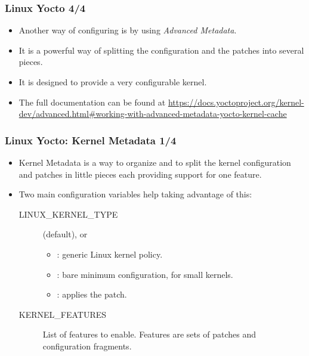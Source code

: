 \begin{frame}
  \frametitle{Linux Yocto 4/4}
  \begin{itemize}
    \item Another way of configuring  is by using
      \emph{Advanced Metadata}.
    \item It is a powerful way of splitting the configuration and the
      patches into several pieces.
    \item It is designed to provide a very configurable kernel.
    \item The full documentation can be found at
      \url{https://docs.yoctoproject.org/kernel-dev/advanced.html\#working-with-advanced-metadata-yocto-kernel-cache}
  \end{itemize}
\end{frame}

\begin{frame}
  \frametitle{Linux Yocto: Kernel Metadata 1/4}
  \begin{itemize}
    \item Kernel Metadata is a way to organize and to split the
      kernel configuration and patches in little pieces each providing
      support for one feature.
    \item Two main configuration variables help taking advantage of
      this:
      \begin{description}
        \item[LINUX\_KERNEL\_TYPE]  (default),
           or 
          \begin{itemize}
            \item {}: generic Linux kernel policy.
            \item {}: bare minimum configuration, for small
              kernels.
            \item {}: applies the 
              patch.
          \end{itemize}
        \item[KERNEL\_FEATURES] List of features to enable. Features
          are sets of patches and configuration fragments.
      \end{description}
  \end{itemize}
\end{frame}

